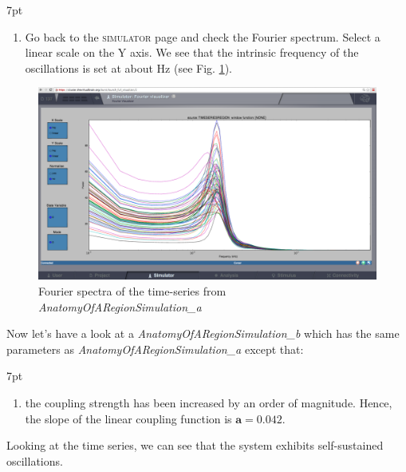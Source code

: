 \documentclass{tufte-handout}
\newenvironment{formal}{%
  \def\FrameCommand{%
    \hspace{1pt}%
    {\color{DarkBlue}\vrule width 2pt}%
    {\color{formalshade}\vrule width 4pt}%
    \colorbox{formalshade}%
  }%
  \MakeFramed{\advance\hsize-\width\FrameRestore}%
  \noindent\hspace{-4.55pt}%
  \begin{adjustwidth}{}{7pt}%
  \vspace{2pt}\vspace{2pt}%
}
{%
  \vspace{2pt}\end{adjustwidth}\endMakeFramed%
}
\newenvironment{simulation}{%
  \def\FrameCommand{%
    \hspace{1pt}%
    {\color{ForestGreen}\vrule width 2pt}%
    {\color{simulationshade}\vrule width 4pt}%
    \colorbox{simulationshade}%
  }%
  \MakeFramed{\advance\hsize-\width\FrameRestore}%
  \noindent\hspace{-4.55pt}%
  \begin{adjustwidth}{}{7pt}%
  \vspace{2pt}\vspace{2pt}%
}
{%
  \vspace{2pt}\end{adjustwidth}\endMakeFramed%
}
\begin{document}
\begin{formal}
\begin{enumerate}
\item Go back to the \textsc{simulator} page and check the Fourier spectrum. Select a linear scale on the Y axis. We see that the intrinsic frequency of the oscillations is set at about \unit[11]{Hz} (see Fig. \ref{fig:fourier}). 
\end{enumerate}
\end{formal}

\begin{figure}[h]
  \includegraphics[width=\linewidth]{Handout_UI_BuildingYourOwnBrainNetworkModel_Fourier}%
  \caption{Fourier spectra of the time-series from \textit{AnatomyOfARegionSimulation\_a}}%
  \label{fig:fourier}%
\end{figure}

Now let's have a look at a \textit{AnatomyOfARegionSimulation\_b} which has the same parameters as \textit{AnatomyOfARegionSimulation\_a} except that:

\begin{simulation}
\begin{enumerate}
\item the coupling strength has been increased by an order of magnitude. Hence, the slope of the linear coupling function is  $\mathbf{a=0.042}$.
\end{enumerate}
\end{simulation}

Looking at the time series, we can see that the system exhibits self-sustained
oscillations. 
\end{document}
